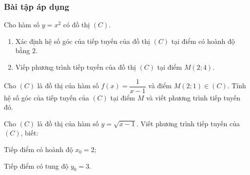 \begin{bt}
\subsubsection{Bài tập áp dụng}
\begin{bt}%
	Cho hàm số $y=x^2$ có đồ thị $(C)$.
	\begin{enumerate}
	\item Xác định hệ số góc của tiếp tuyến của đồ thị $(C)$ tại điểm có hoành độ bằng $2$.
	\item Viếp phương trình tiếp tuyến của đồ thị $(C)$ tại điểm $M(2;4)$.
	\end{enumerate}
\end{bt}
\begin{bt}%
	Cho $(C)$ là đồ thị của hàm số $f(x)=\dfrac{1}{x-1}$ và điểm $M(2; 1) \in(C)$. Tính hệ số góc của tiếp tuyến của $(C)$ tại điểm $M$ và viết phương trình tiếp tuyến đó.
\end{bt}
\begin{bt}%
	Cho $(C)$ là đồ thị của hàm số $y=\sqrt{x-1}$. Viết phương trình tiếp tuyến của $(C)$, biết:
	\begin{listEX}[2]
	\item Tiếp điểm có hoành độ $x_0=2$;
	\item Tiếp điểm có tung độ $y_0=3$.
	\end{listEX}	
\end{bt}
\end{bt}
